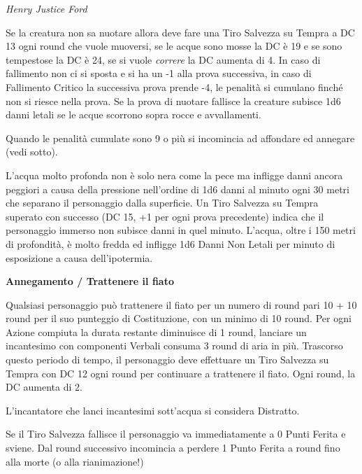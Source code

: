 \begin{multicols}{2}
\begin{center}
	\emph{Henry Justice Ford}\end{center}

\medskip

Se la creatura non sa nuotare allora deve fare una Tiro Salvezza su Tempra a DC 13 ogni round che vuole muoversi, se le acque sono mosse la DC è 19 e se sono tempestose la DC è 24, se si vuole \emph{correre} la DC aumenta di 4.
In caso di fallimento non ci si sposta e si ha un -1 alla prova successiva, in caso di Fallimento Critico la successiva prova prende -4, le penalità si cumulano finché non si riesce nella prova.
Se la prova di nuotare fallisce la creature subisce 1d6 danni letali se le acque scorrono sopra rocce e avvallamenti.

Quando le penalità cumulate sono 9 o più si incomincia ad affondare ed annegare (vedi sotto).

L'acqua molto profonda non è solo nera come la pece ma infligge danni ancora peggiori a causa della pressione nell'ordine di 1d6 danni al minuto ogni 30 metri che separano il personaggio dalla superficie. Un Tiro Salvezza su Tempra superato con successo (DC 15, +1 per ogni prova precedente) indica che il personaggio immerso non subisce danni in quel minuto. L'acqua, oltre i 150 metri di profondità, è molto fredda ed infligge 1d6 Danni Non Letali per minuto di esposizione a causa dell'ipotermia.

\medskip

\textbf{Annegamento / Trattenere il fiato}\hypertarget{trattenereilfiato}{}\label{trattenereilfiato}

\medskip

Qualsiasi personaggio può trattenere il fiato per un numero di round pari 10 + 10 round per il suo punteggio di Costituzione, con un minimo di 10 round. Per ogni Azione compiuta la durata restante diminuisce di 1 round, lanciare un incantesimo con componenti Verbali consuma 3 round di aria in più. Trascorso questo periodo di tempo, il personaggio deve effettuare un Tiro Salvezza su Tempra con DC 12 ogni round per continuare a trattenere il fiato. Ogni round, la DC aumenta di 2.

L'incantatore che lanci incantesimi sott'acqua si considera Distratto.

Se il Tiro Salvezza fallisce il personaggio va immediatamente a 0 Punti Ferita e sviene. Dal round successivo incomincia a perdere 1 Punto Ferita a round fino alla morte (o alla rianimazione!)


\end{multicols}
